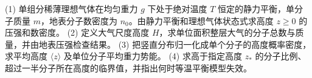 (1) 单组分稀薄理想气体在均匀重力 \(g\) 下处于绝对温度 \(T\) 恒定的静力平衡，单分子质量 \(m\)，地表分子数密度为 \(n_0\)。由静力平衡和理想气体状态式求高度 \(z\ge0\) 的压强和数密度。
(2) 定义大气尺度高度 \(H\)，求单位面积整层大气的分子总数与质量，并由地表压强检查结果。
(3) 把竖直分布归一化成单个分子的高度概率密度，求平均高度 \(\langle z\rangle\) 及单位分子平均重力势能。
(4) 求高于指定高度 \(z_*\) 的分子比例、超过一半分子所在高度的临界值，并指出何时等温平衡模型失效。
